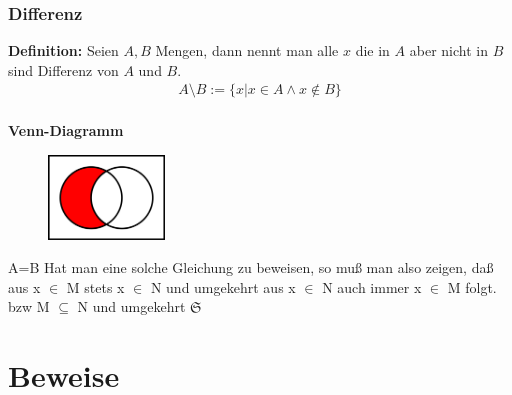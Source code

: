 \documentclass[../AbiMappe_Mathe.tex]{subfiles}
\begin{document}
\subsubsection{Differenz}
\textbf{Definition:} Seien $A,B$ Mengen, dann nennt man alle $x$ die in $A$ aber nicht in $B$ sind Differenz von $A$ und $B$.
\begin{align*}
A \setminus B:=\{x|x \in A \land x \notin B\}
\end{align*}
\\
\textbf{Venn-Diagramm}
\begin{figure}[H]
\centering
\includegraphics[width=117px, height=85.5px]{VennDiff.png}
\end{figure}

A=B
Hat man eine solche Gleichung zu beweisen, so muß man also zeigen, daß aus x $\in$ M stets x $\in$ N und umgekehrt aus x $\in$ N auch immer x $\in$ M folgt. bzw M $\subseteq$ N und umgekehrt
 $\mathfrak{S}$

 \section{Beweise}
\end{document}
